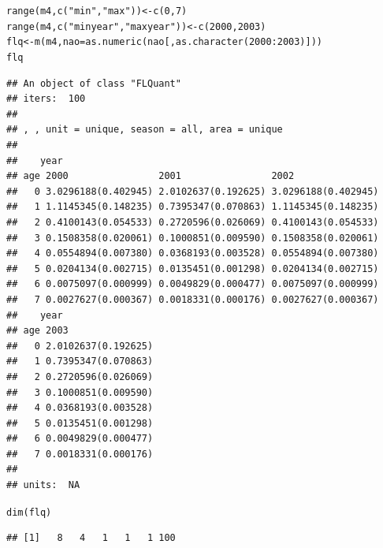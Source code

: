 \documentclass[a4paper,english,10pt]{article}\usepackage[]{graphicx}\usepackage[]{color}
\makeatletter
\newcommand{\hlnum}[1]{\textcolor[rgb]{0.063,0.58,0.627}{#1}}%
\newcommand{\hlstr}[1]{\textcolor[rgb]{0.063,0.58,0.627}{#1}}%
\newcommand{\hlopt}[1]{\textcolor[rgb]{0.196,0.196,0.196}{#1}}%
\newcommand{\hlstd}[1]{\textcolor[rgb]{0.196,0.196,0.196}{#1}}%
\newcommand{\hlkwb}[1]{\textcolor[rgb]{0.627,0,0.314}{#1}}%
\newcommand{\hlkwc}[1]{\textcolor[rgb]{0,0.631,0.314}{#1}}%
\newcommand{\hlkwd}[1]{\textcolor[rgb]{0.78,0.227,0.412}{#1}}%
\newenvironment{kframe}{%
 \def\at@end@of@kframe{}%
 \ifinner\ifhmode%
  \def\at@end@of@kframe{\end{minipage}}%
  \begin{minipage}{\columnwidth}%
 \fi\fi%
 \def\FrameCommand##1{\hskip\@totalleftmargin \hskip-\fboxsep
 \colorbox{shadecolor}{##1}\hskip-\fboxsep
     \hskip-\linewidth \hskip-\@totalleftmargin \hskip\columnwidth}%
 \MakeFramed {\advance\hsize-\width
   \@totalleftmargin\z@ \linewidth\hsize
   \@setminipage}}%
 {\par\unskip\endMakeFramed%
 \at@end@of@kframe}
\newenvironment{knitrout}{}{} %
\makeatother
\begin{document}
\begin{knitrout}
\color{fgcolor}\begin{kframe}
\begin{alltt}
\hlkwd{range}\hlstd{(m4,} \hlkwd{c}\hlstd{(}\hlstr{"min"}\hlstd{,} \hlstr{"max"}\hlstd{))} \hlkwb{<-} \hlkwd{c}\hlstd{(}\hlnum{0}\hlstd{,} \hlnum{7}\hlstd{)}
\hlkwd{range}\hlstd{(m4,} \hlkwd{c}\hlstd{(}\hlstr{"minyear"}\hlstd{,} \hlstr{"maxyear"}\hlstd{))} \hlkwb{<-} \hlkwd{c}\hlstd{(}\hlnum{2000}\hlstd{,} \hlnum{2003}\hlstd{)}
\hlstd{flq} \hlkwb{<-} \hlkwd{m}\hlstd{(m4,} \hlkwc{nao} \hlstd{=} \hlkwd{as.numeric}\hlstd{(nao[,} \hlkwd{as.character}\hlstd{(}\hlnum{2000}\hlopt{:}\hlnum{2003}\hlstd{)]))}
\hlstd{flq}
\end{alltt}
\begin{verbatim}
## An object of class "FLQuant"
## iters:  100 
## 
## , , unit = unique, season = all, area = unique
## 
##    year
## age 2000                2001                2002               
##   0 3.0296188(0.402945) 2.0102637(0.192625) 3.0296188(0.402945)
##   1 1.1145345(0.148235) 0.7395347(0.070863) 1.1145345(0.148235)
##   2 0.4100143(0.054533) 0.2720596(0.026069) 0.4100143(0.054533)
##   3 0.1508358(0.020061) 0.1000851(0.009590) 0.1508358(0.020061)
##   4 0.0554894(0.007380) 0.0368193(0.003528) 0.0554894(0.007380)
##   5 0.0204134(0.002715) 0.0135451(0.001298) 0.0204134(0.002715)
##   6 0.0075097(0.000999) 0.0049829(0.000477) 0.0075097(0.000999)
##   7 0.0027627(0.000367) 0.0018331(0.000176) 0.0027627(0.000367)
##    year
## age 2003               
##   0 2.0102637(0.192625)
##   1 0.7395347(0.070863)
##   2 0.2720596(0.026069)
##   3 0.1000851(0.009590)
##   4 0.0368193(0.003528)
##   5 0.0135451(0.001298)
##   6 0.0049829(0.000477)
##   7 0.0018331(0.000176)
## 
## units:  NA
\end{verbatim}
\begin{alltt}
\hlkwd{dim}\hlstd{(flq)}
\end{alltt}
\begin{verbatim}
## [1]   8   4   1   1   1 100
\end{verbatim}
\end{kframe}
\end{knitrout}
\end{document}
